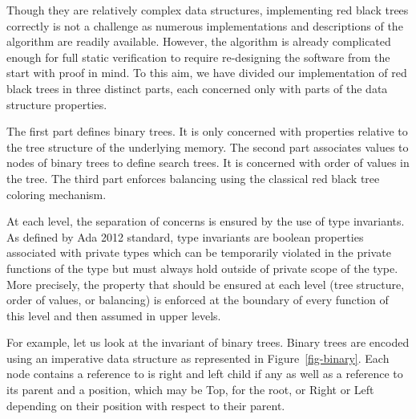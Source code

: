 \documentclass[11pt,a4paper]{article}
\begin{document}
Though they are relatively complex data structures, implementing red black trees
correctly is not a challenge as numerous implementations and descriptions of the
algorithm are readily available. However, the algorithm is already complicated
enough for full static verification to require re-designing the
software from the start with proof in mind.
To this aim, we have divided our implementation of red black trees in three
distinct parts, each concerned only with parts of the data structure properties.

The first part defines binary trees. It is only concerned with properties
relative to the tree structure of the underlying memory.
The second part associates values to nodes of binary trees to define search trees.
It is concerned with order of values in the tree.
The third part enforces balancing using the classical red black tree coloring
mechanism.

At each level, the separation of concerns is ensured by the use of type invariants.
As defined by Ada 2012 standard, type invariants are boolean properties associated
with private types which can be temporarily violated in the private functions of the
type but must always hold outside of private scope of the type.
More precisely, the property that should be ensured at each level (tree structure,
order of values, or balancing) is enforced at the boundary of every function
of this level and then assumed in upper levels.

For example, let us look at the invariant of binary trees. Binary trees are
encoded using an imperative data structure as represented in Figure~\ref{fig-binary}.
Each node contains a reference to is right and left child if any as well as a
reference to its parent and a position, which may be Top, for the root, or
Right or Left depending on their position with respect to their parent.
\end{document}
